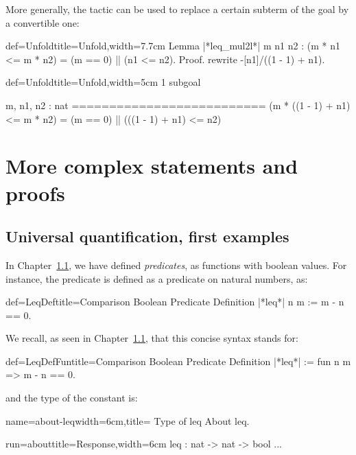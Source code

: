 More generally, the  tactic can be used to replace a
certain subterm of the goal by a convertible one:

\begin{coq}{def=Unfold}{title=Unfold,width=7.7cm}
Lemma |*leq_mul2l*| m n1 n2 :
(m * n1 <= m * n2) = (m == 0) || (n1 <= n2).
Proof.
rewrite -[n1]/((1 - 1) + n1).
\end{coq}
\begin{coqout}{def=Unfold}{title=Unfold,width=5cm}
1 subgoal

m, n1, n2 : nat
==========================
(m * ((1 - 1) + n1) <= m * n2) =
(m == 0) || (((1 - 1) + n1) <= n2)
\end{coqout}




\section{More complex statements and proofs}

\subsection{Universal quantification, first examples}
In Chapter~\ref{}, we have defined \emph{predicates}, as functions
with boolean values. For instance, the  predicate is defined as
a predicate on natural numbers, as:
\begin{coq}{def=LeqDef}{title=Comparison Boolean Predicate}
Definition |*leq*| n m := m - n == 0.
\end{coq}

We recall, as seen in Chapter~\ref{}, that this concise syntax stands
for:

\begin{coq}{def=LeqDefFun}{title=Comparison Boolean Predicate}
Definition |*leq*| := fun n m => m - n == 0.
\end{coq}
and the type of the constant  is:

\begin{coq}{name=about-leq}{width=6cm,title= Type of leq}
About leq.
\end{coq}
\begin{coqout}{run=about}{title=Response,width=6cm}
leq : nat -> nat -> bool
...
\end{coqout}

